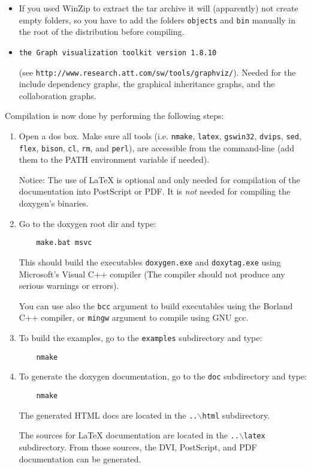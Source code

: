 \begin{itemize}
\item If you used Win\-Zip to extract the tar archive it will (apparently) not create empty folders, so you have to add the folders {\tt objects} and {\tt bin} manually in the root of the distribution before compiling.

\item {\tt the Graph visualization toolkit version 1.8.10}\par
 (see {\tt http://www.research.att.com/sw/tools/graphviz/}). Needed for the include dependency graphs, the graphical inheritance graphs, and the collaboration graphs. \end{itemize}


Compilation is now done by performing the following steps:

\begin{enumerate}
\item Open a dos box. Make sure all tools (i.e. {\tt nmake}, {\tt latex}, {\tt gswin32}, {\tt dvips}, {\tt sed}, {\tt flex}, {\tt bison}, {\tt cl}, {\tt rm}, and {\tt perl}), are accessible from the command-line (add them to the PATH environment variable if needed).

Notice: The use of La\-Te\-X is optional and only needed for compilation of the documentation into Post\-Script or PDF. It is {\em not\/} needed for compiling the doxygen's binaries.

\item Go to the doxygen root dir and type:



\footnotesize\begin{verbatim}
    make.bat msvc
\end{verbatim}
\normalsize


This should build the executables {\tt doxygen.exe} and {\tt doxytag.exe} using Microsoft's Visual C++ compiler (The compiler should not produce any serious warnings or errors).

You can use also the {\tt bcc} argument to build executables using the Borland C++ compiler, or {\tt mingw} argument to compile using GNU gcc.

\item To build the examples, go to the {\tt examples} subdirectory and type:



\footnotesize\begin{verbatim}
    nmake
\end{verbatim}
\normalsize


\item To generate the doxygen documentation, go to the {\tt doc} subdirectory and type:



\footnotesize\begin{verbatim}
    nmake
\end{verbatim}
\normalsize


The generated HTML docs are located in the {\tt ..$\backslash$html} subdirectory.

The sources for La\-Te\-X documentation are located in the {\tt ..$\backslash$latex} subdirectory. From those sources, the DVI, Post\-Script, and PDF documentation can be generated. \end{enumerate}
